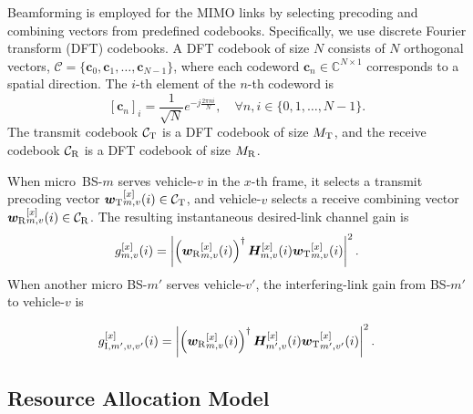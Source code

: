 \documentclass[10pt,journal,letterpaper]{IEEEtran}
\newcommand{\rev}[1]{\textcolor{revisioncolor}{{}#1}}
\newcommand{\omitted}[1]{}
\theoremstyle{remark}
\begin{document}
Beamforming is employed for the MIMO links by selecting precoding and combining vectors from predefined codebooks. 
Specifically, we use discrete Fourier transform (DFT) codebooks. A DFT codebook of size $N$ consists of $N$ orthogonal vectors, $\mathcal{C} = \{\boldsymbol{c}_0, \boldsymbol{c}_1, \dots, \boldsymbol{c}_{N-1}\}$, where each codeword $\boldsymbol{c}_n \in \mathbb{C}^{N \times 1}$ corresponds to a spatial direction. The $i$-th element of the $n$-th codeword is
\begin{equation}
\label{eq:dft_codebook}
    [\boldsymbol{c}_n]_i = \frac{1}{\sqrt{N}} e^{-j \frac{2\pi ni}{N}}, \quad \forall n, i \in \{0, 1, \dots, N-1\}.
\end{equation}
The transmit codebook $\mathcal{C}_{\rm T}$ is a DFT codebook of size $M_{\rm T}$, and the receive codebook $\mathcal{C}_{\rm R}$ is a DFT codebook of size $M_{\rm R}$. 

When micro~BS-$m$ serves vehicle-$v$ in the $x$-th frame, it selects a transmit precoding vector ${\bm{w}_{\rm T}}_{m,v}^{[x]}(i) \in \mathcal{C}_{\rm T}$, and vehicle-$v$ selects a receive combining vector ${\bm{w}_{\rm R}}_{m,v}^{[x]}(i) \in \mathcal{C}_{\rm R}$. The resulting
instantaneous {desired-link} channel gain is
\begin{equation}
\label{eq:mimo_instant_gain}
    g_{m,v}^{[x]}(i) = \left| \left({\bm{w}_{\rm R}}_{m,v}^{[x]}(i)\right)^{\dagger} \boldsymbol{H}_{m,v}^{[x]}(i) {\bm{w}_{\rm T}}_{m,v}^{[x]} (i)\right|^2.
\end{equation}
\omitted{}\rev{When another micro BS-$m'$ serves vehicle-$v'$, the interfering-link gain from BS-$m'$ to vehicle-$v$ is}

{\color{revisioncolor}
\begin{equation}
\label{eq:mimo_instant_gain_interference}
    g_{{\rm I},m',v,v'}^{[x]}(i)
    = \left|\left({\bm{w}_{\rm R}}_{m,v}^{[x]}(i)\right)^{\dagger}
    \boldsymbol{H}_{m',v}^{[x]}(i){\bm{w}_{\rm T}}_{m',v'}^{[x]}(i)\right|^2.
\end{equation}
}
\omitted{}


\subsection{Resource Allocation Model}
\end{document}
